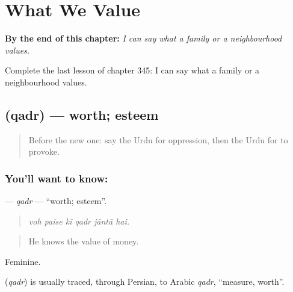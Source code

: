
\chapter{What We Value}
\label{ch:ur-what-we-value}

\begin{chapteropening}
\textbf{By the end of this chapter:} \emph{I can say what a family or a neighbourhood values.}

Complete the last lesson of chapter 345: I can say what a family or a neighbourhood values.
\end{chapteropening}

\section[\texorpdfstring{\ur{قدر} (qadr)}{قدر (qadr)}]{ (qadr) — worth; esteem}

\label{lesson:UR-C345-qadr}



\begin{quote}
Before the new one: say the Urdu for oppression, then the Urdu for to provoke.
\end{quote}

\subsection*{You'll want to know: }
\textbf{} — \emph{qadr} — \textquotedblleft{}worth; esteem\textquotedblright{}.

\begin{quote}
     
\end{quote}

\begin{quote}
\emph{voh paise kī qadr jāntā hai.}
\end{quote}

\begin{quote}
He knows the value of money.
\end{quote}

Feminine.

\begin{cousinweb}
\textbf{} (\emph{qadr}) is usually traced, through Persian, to Arabic \emph{qadr}, \textquotedblleft{}measure, worth\textquotedblright{}.
\end{cousinweb}

